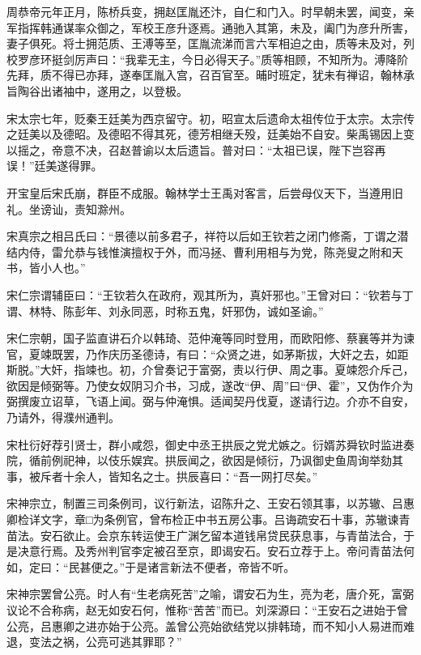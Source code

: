 \documentclass[a4paper,12pt,UTF8,twoside]{ctexbook}
\begin{document}
    周恭帝元年正月，陈桥兵变，拥赵匡胤还汴，自仁和门入。时早朝未罢，闻变，亲军指挥韩通谋率众御之，军校王彦升逐焉。通驰入其第，未及，阖门为彦升所害，妻子俱死。将士拥范质、王溥等至，匡胤流涕而言六军相迫之由，质等未及对，列校罗彦环挺剑厉声曰：“我辈无主，今日必得天子。”质等相顾，不知所为。溥降阶先拜，质不得已亦拜，遂奉匡胤入宫，召百官至。晡时班定，犹未有禅诏，翰林承旨陶谷出诸袖中，遂用之，以登极。
    
    宋太宗七年，贬秦王廷美为西京留守。初，昭宣太后遗命太祖传位于太宗。太宗传之廷美以及德昭。及德昭不得其死，德芳相继夭殁，廷美始不自安。柴禹锡因上变以摇之，帝意不决，召赵普谕以太后遗旨。普对曰：“太祖已误，陛下岂容再误！”廷美遂得罪。
    
    开宝皇后宋氏崩，群臣不成服。翰林学士王禹对客言，后尝母仪天下，当遵用旧礼。坐谤讪，责知滁州。
    
    宋真宗之相吕氏曰：“景德以前多君子，祥符以后如王钦若之闭门修斋，丁谓之潜结内侍，雷允恭与钱惟演擅权于外，而冯拯、曹利用相与为党，陈尧叟之附和天书，皆小人也。”
    
    宋仁宗谓辅臣曰：“王钦若久在政府，观其所为，真奸邪也。”王曾对曰：“钦若与丁谓、林特、陈彭年、刘永同恶，时称五鬼，奸邪伪，诚如圣谕。”
    
    宋仁宗朝，国子监直讲石介以韩琦、范仲淹等同时登用，而欧阳修、蔡襄等并为谏官，夏竦既罢，乃作庆历圣德诗，有曰：“众贤之进，如茅斯拔，大奸之去，如距斯脱。”大奸，指竦也。初，介曾奏记于富弼，责以行伊、周之事。夏竦怨介斥己，欲因是倾弼等。乃使女奴阴习介书，习成，遂改“伊、周”曰“伊、霍”，又伪作介为弼撰废立诏草，飞语上闻。弼与仲淹惧。适闻契丹伐夏，遂请行边。介亦不自安，乃请外，得濮州通判。
    
    宋杜衍好荐引贤士，群小咸怨，御史中丞王拱辰之党尤嫉之。衍婿苏舜钦时监进奏院，循前例祀神，以伎乐娱宾。拱辰闻之，欲因是倾衍，乃讽御史鱼周询举劾其事，被斥者十余人，皆知名之士。拱辰喜曰：“吾一网打尽矣。”
    
    宋神宗立，制置三司条例司，议行新法，诏陈升之、王安石领其事，以苏辙、吕惠卿检详文字，章□为条例官，曾布检正中书五房公事。吕诲疏安石十事，苏辙谏青苗法。安石欲止。会京东转运使王广渊乞留本道钱帛贷民获息事，与青苗法合，于是决意行焉。及秀州判官李定被召至京，即谒安石。安石立荐于上。帝问青苗法何如，定曰：“民甚便之。”于是诸言新法不便者，帝皆不听。
    
    宋神宗罢曾公亮。时人有“生老病死苦”之喻，谓安石为生，亮为老，唐介死，富弼议论不合称病，赵无如安石何，惟称“苦苦”而已。刘深源曰：“王安石之进始于曾公亮，吕惠卿之进亦始于公亮。盖曾公亮始欲结党以排韩琦，而不知小人易进而难退，变法之祸，公亮可逃其罪耶？”
    
\end{document}
